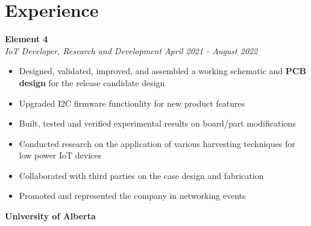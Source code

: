 \documentclass[letterpaper,20pt]{article}
\begin{document}
\section{Experience}
    \vspace{-1pt}
        \textbf{Element 4}\hspace{13.5 cm}
        \textit{}\\
        \textit{IoT Developer, Research and Development} \hspace{7.8 cm}
        \textit{April 2021 - August 2022} \\
        \vspace{-18pt} 
        \hspace{-1pt}

    \begin{itemize}
        \item Designed, validated, improved, and assembled a working schematic and \textbf{PCB design} for the release candidate design \vspace{-5pt}
        \item Upgraded I2C firmware functionlity for new product features \vspace{-5pt}
        \item Built, tested and verified experimental results on board/part modifications  \vspace{-5pt}
        \item Conducted research on the application of various harvesting techniques for low power IoT devices \vspace{-5pt}
        
        \item Collaborated with third parties on the case design and fabrication \vspace{-5pt}
        \item Promoted and represented the company in networking events 
        
    \end{itemize}
    \vspace{-1pt}
        \textbf{University of Alberta}\hspace{3cm}
\end{document}
